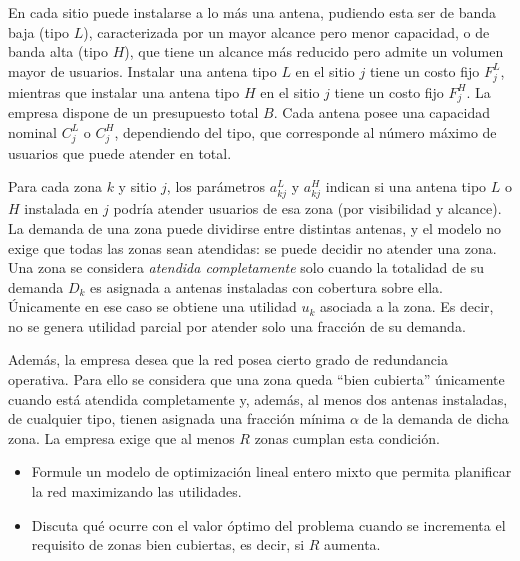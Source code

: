 \documentclass[
	spanish, %
	letterpaper, oneside
]{article}
\begin{document}
En cada sitio puede instalarse a lo más una antena, pudiendo esta ser de banda baja (tipo $L$), caracterizada por un mayor alcance pero menor capacidad, o de banda alta (tipo $H$), que tiene un alcance más reducido pero admite un volumen mayor de usuarios. Instalar una antena tipo $L$ en el sitio $j$ tiene un costo fijo $F_j^L$, mientras que instalar una antena tipo $H$ en el sitio $j$ tiene un costo fijo $F_j^H$. La empresa dispone de un presupuesto total $B$. Cada antena posee una capacidad nominal $C_j^L$ o $C_j^H$, dependiendo del tipo, que corresponde al número máximo de usuarios que puede atender en total.

Para cada zona $k$ y sitio $j$, los parámetros $a_{kj}^L$ y $a_{kj}^H$ indican si una antena tipo $L$ o $H$ instalada en $j$ podría atender usuarios de esa zona (por visibilidad y alcance). La demanda de una zona puede dividirse entre distintas antenas, y el modelo no exige que todas las zonas sean atendidas: se puede decidir no atender una zona. Una zona se considera \textit{atendida completamente} solo cuando la totalidad de su demanda $D_k$ es asignada a antenas instaladas con cobertura sobre ella. Únicamente en ese caso se obtiene una utilidad $u_k$ asociada a la zona. Es decir, no se genera utilidad parcial por atender solo una fracción de su demanda.

Además, la empresa desea que la red posea cierto grado de redundancia operativa. Para ello se considera que una zona queda ``bien cubierta'' únicamente cuando está atendida completamente y, además, al menos dos antenas instaladas, de cualquier tipo, tienen asignada una fracción mínima $\alpha$ de la demanda de dicha zona. La empresa exige que al menos $R$ zonas cumplan esta condición.

\begin{itemize}
    \item[a)] Formule un modelo de optimización lineal entero mixto que permita planificar la red maximizando las utilidades.
    \item[b)] Discuta qué ocurre con el valor óptimo del problema cuando se incrementa el requisito de zonas bien cubiertas, es decir, si $R$ aumenta.
\end{itemize}


\end{document}
